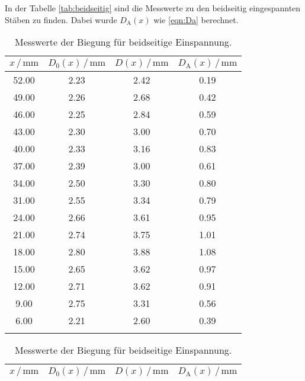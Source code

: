 In der Tabelle \ref{tab:beidseitig} sind die Messwerte zu den beidseitig eingespannten Stäben zu finden.
Dabei wurde $D_\text{A}(x)$ wie \eqref{eqn:Da} berechnet.

\begin{table}
\centering
\caption{Messwerte der Biegung für beidseitige Einspannung.}
\begin{tabular}[t]{cccc}
    \toprule
    $x\,/\,\si{\milli\meter}$ & $D_0(x) \,/\, \si{\milli\meter}$ & $D(x) \,/\, \si{\milli\meter}$ & $D_\text{A}(x) \,/\, \si{\milli\meter}$\\
    \midrule
    52.00 & 2.23 & 2.42 & 0.19 \\
    49.00 & 2.26 & 2.68 & 0.42 \\
    46.00 & 2.25 & 2.84 & 0.59 \\
    43.00 & 2.30 & 3.00 & 0.70 \\
    40.00 & 2.33 & 3.16 & 0.83 \\
    37.00 & 2.39 & 3.00 & 0.61 \\
    34.00 & 2.50 & 3.30 & 0.80 \\
    31.00 & 2.55 & 3.34 & 0.79 \\
    24.00 & 2.66 & 3.61 & 0.95 \\
    21.00 & 2.74 & 3.75 & 1.01 \\
    18.00 & 2.80 & 3.88 & 1.08 \\
    15.00 & 2.65 & 3.62 & 0.97 \\
    12.00 & 2.71 & 3.62 & 0.91 \\
    9.00 & 2.75 & 3.31 & 0.56 \\
    6.00 & 2.21 & 2.60 & 0.39 \\
    \bottomrule
    
    \label{tab:beid_eckig}
\end{tabular}
\begin{tabular}[t]{cccc}
    \toprule
    $x\,/\,\si{\milli\meter}$ & $D_0(x) \,/\, \si{\milli\meter}$ & $D(x) \,/\, \si{\milli\meter}$ & $D_\text{A}(x) \,/\, \si{\milli\meter}$\\
    \midrule
    

\end{tabular}
\end{table}
